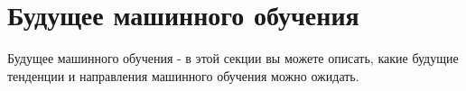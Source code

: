 
\section{Будущее машинного обучения}\label{sec:the_future_of_ml}
Будущее машинного обучения - в этой секции вы можете описать, какие будущие тенденции и направления машинного обучения можно ожидать.